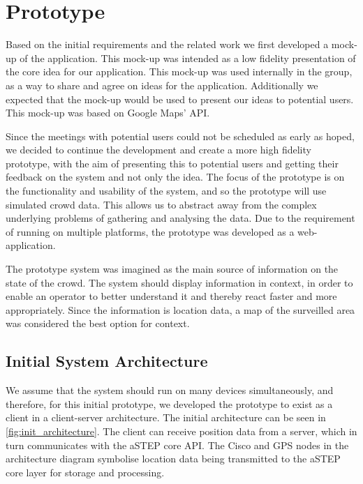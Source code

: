 \section{Prototype} \label{sec:s1_prototype}
Based on the initial requirements and the related work we first developed a mock-up of the application. This mock-up was intended as a low fidelity presentation of the core idea for our application. This mock-up was used internally in the group, as a way to share and agree on ideas for the application. Additionally we expected that the mock-up would be used to present our ideas to potential users. This mock-up was based on Google Maps' API.

Since the meetings with potential users could not be scheduled as early as hoped, we decided to continue the development and create a more high fidelity prototype, with the aim of presenting this to potential users and getting their feedback on the system and not only the idea. The focus of the prototype is on the functionality and usability of the system, and so the prototype will use simulated crowd data. This allows us to abstract away from the complex underlying problems of gathering and analysing the data. Due to the requirement of running on multiple platforms, the prototype was developed as a web-application.

The prototype system was imagined as the main source of information on the state of the crowd. The system should display information in context, in order to enable an operator to better understand it and thereby react faster and more appropriately. Since the information is location data, a map of the surveilled area was considered the best option for context.


\subsection{Initial System Architecture}
We assume that the system should run on many devices simultaneously, and therefore, for this initial prototype, we developed the prototype to exist as a client in a client-server architecture. The initial architecture can be seen in \cref{fig:init_architecture}. The client can receive position data from a server, which in turn communicates with the aSTEP core API. The Cisco and GPS nodes in the architecture diagram symbolise location data being transmitted to the aSTEP core layer for storage and processing.

